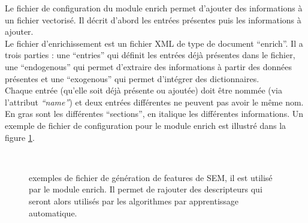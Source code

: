 \documentclass[manual-fr.tex]{subfiles}
\begin{document}
Le fichier de configuration du module enrich permet d'ajouter des informations à un fichier vectorisé. Il décrit d'abord les entrées présentes
puis les informations à ajouter.\\

Le fichier d'enrichissement est un fichier XML de type de document ``enrich''. Il a trois parties : une ``entries'' qui définit les entrées déjà
présentes dans le fichier, une ``endogenous'' qui permet d'extraire des informations à partir des données présentes et une ``exogenous'' qui permet
d'intégrer des dictionnaires.\\

Chaque entrée (qu'elle soit déjà présente ou ajoutée) doit être nommée (via l'attribut \emph{``name''}) et deux entrées différentes ne peuvent pas
avoir le même nom. En gras sont les différentes ``sections'', en italique les différentes informations. Un exemple de fichier de configuration pour le module enrich est illustré dans la figure \ref{fig:sem-features}.\\

\begin{figure}[ht!]
\footnotesize
\begin{xml}
\\
\end{xml}
\caption{exemples de fichier de génération de features de SEM, il est utilisé par le module enrich. Il permet de rajouter des descripteurs qui seront alors utilisés par les algorithmes par apprentissage automatique.}
\label{fig:sem-features}
\end{figure}
\end{document}
